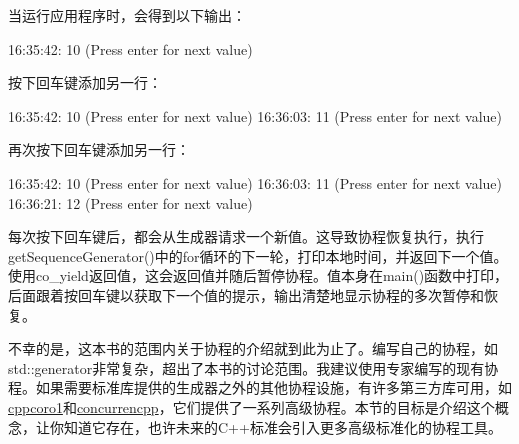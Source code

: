 当运行应用程序时，会得到以下输出：

\begin{shell}
16:35:42: 10 (Press enter for next value)
\end{shell}

按下回车键添加另一行：

\begin{shell}
16:35:42: 10 (Press enter for next value)
16:36:03: 11 (Press enter for next value)
\end{shell}

再次按下回车键添加另一行：

\begin{shell}
16:35:42: 10 (Press enter for next value)
16:36:03: 11 (Press enter for next value)
16:36:21: 12 (Press enter for next value)
\end{shell}

每次按下回车键后，都会从生成器请求一个新值。这导致协程恢复执行，执行getSequenceGenerator()中的for循环的下一轮，打印本地时间，并返回下一个值。使用co\_yield返回值，这会返回值并随后暂停协程。值本身在main()函数中打印，后面跟着按回车键以获取下一个值的提示，输出清楚地显示协程的多次暂停和恢复。

不幸的是，这本书的范围内关于协程的介绍就到此为止了。编写自己的协程，如std::generator非常复杂，超出了本书的讨论范围。我建议使用专家编写的现有协程。如果需要标准库提供的生成器之外的其他协程设施，有许多第三方库可用，如\href{https://github.com/lewissbaker/cppcoro}{cppcoro1}和\href{https://github.com/David-Haim/concurrencpp}{concurrencpp}，它们提供了一系列高级协程。本节的目标是介绍这个概念，让你知道它存在，也许未来的C++标准会引入更多高级标准化的协程工具。





